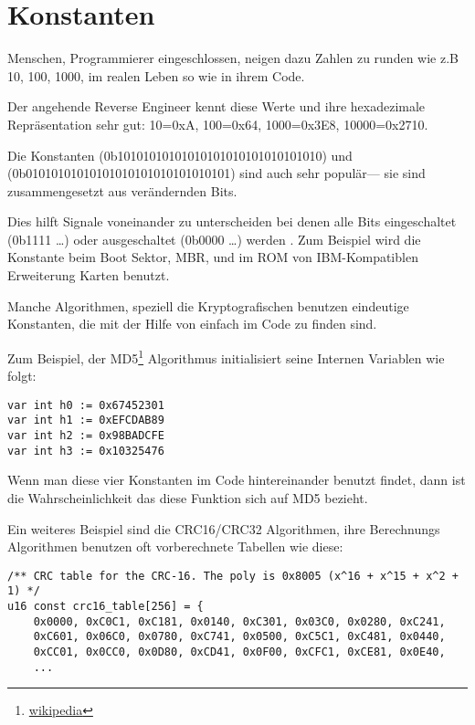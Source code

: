 \section{Konstanten}

Menschen, Programmierer eingeschlossen, neigen dazu Zahlen zu runden wie z.B 10, 100, 1000,
im realen Leben so wie in ihrem Code.

Der angehende Reverse Engineer kennt diese Werte und ihre hexadezimale Repr\"asentation sehr gut:
10=0xA, 100=0x64, 1000=0x3E8, 10000=0x2710.

Die Konstanten  (0b10101010101010101010101010101010) und 
 (0b01010101010101010101010101010101) sind auch sehr popul\"ar---
sie sind zusammengesetzt aus ver\"andernden Bits. %

Dies hilft Signale voneinander zu unterscheiden bei denen alle Bits eingeschaltet (0b1111 \dots) oder ausgeschaltet (0b0000 \dots) werden .
Zum Beispiel wird die Konstante  beim Boot Sektor, \ac{MBR},
und im \ac{ROM} von IBM-Kompatiblen Erweiterung Karten benutzt.

Manche Algorithmen, speziell die Kryptografischen benutzen eindeutige Konstanten, die mit der Hilfe von \IDA einfach im Code zu finden sind.

\newcommand{\URLMD}{http://go.yurichev.com/17111}

Zum Beispiel, der MD5\footnote{\href{\URLMD}{wikipedia}} Algorithmus initialisiert seine Internen Variablen wie folgt:


\begin{verbatim}
var int h0 := 0x67452301
var int h1 := 0xEFCDAB89
var int h2 := 0x98BADCFE
var int h3 := 0x10325476
\end{verbatim}

Wenn man diese vier Konstanten im Code hintereinander benutzt findet, dann ist die Wahrscheinlichkeit das diese Funktion 
sich auf MD5 bezieht.

\par Ein weiteres Beispiel sind die CRC16/CRC32 Algorithmen,
ihre Berechnungs Algorithmen benutzen oft vorberechnete Tabellen wie diese:

\begin{lstlisting}[caption=linux/lib/crc16.c,style=customc]
/** CRC table for the CRC-16. The poly is 0x8005 (x^16 + x^15 + x^2 + 1) */
u16 const crc16_table[256] = {
	0x0000, 0xC0C1, 0xC181, 0x0140, 0xC301, 0x03C0, 0x0280, 0xC241,
	0xC601, 0x06C0, 0x0780, 0xC741, 0x0500, 0xC5C1, 0xC481, 0x0440,
	0xCC01, 0x0CC0, 0x0D80, 0xCD41, 0x0F00, 0xCFC1, 0xCE81, 0x0E40,
	...
\end{lstlisting}

